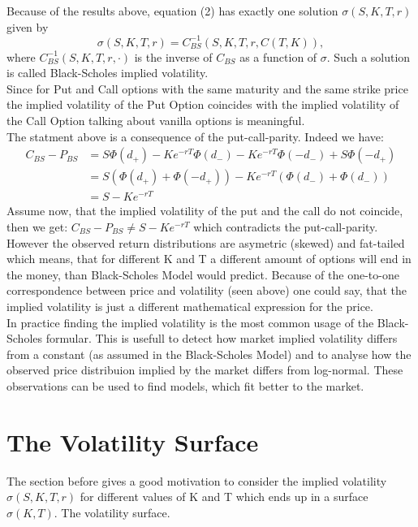 \documentclass[12pt]{article}
\newcommand{\C}{C_{BS}}
\begin{document}
Because of the results above, equation (2) has exactly one solution $\sigma(S,K,T,r)$ given by
$$\sigma(S,K,T,r)=\C^{-1}(S,K,T,r,C(T,K)),$$
where $\C^{-1}(S,K,T,r,\cdot)$ is the inverse of $\C$ as a function of $\sigma$.
Such a solution is called Black-Scholes implied volatility.\\
Since for Put and Call options with the same maturity and the same strike price the implied volatility of the Put Option coincides with the implied volatility of the Call Option talking about vanilla options is meaningful.\\
The statment above is a consequence of the put-call-parity. Indeed we have:
\begin{align*}
\C-P_{BS}&=S\Phi(d_+)-Ke^{-rT}\Phi(d_-)-Ke^{-rT}\Phi(-d_-)+S\Phi(-d_+)\\
&=S(\Phi(d_+)+\Phi(-d_+))-Ke^{-rT}(\Phi(d_-)+\Phi(d_-))\\
&=S-Ke^{-rT}
\end{align*}
Assume now, that the implied volatility of the put and the call do not coincide, then we get:
$\C-P_{BS}\neq S-Ke^{-rT}$ which contradicts the put-call-parity.\\
However the observed return distributions are asymetric (skewed) and fat-tailed which means, that for different K and T a different amount of options will end in the money, than Black-Scholes Model would predict. 
Because of the one-to-one correspondence between price and volatility (seen above) one could say, that the implied volatility is just a different mathematical expression for the price.\\
In practice finding the implied volatility is the most common usage of the Black-Scholes formular. This is usefull to detect how market implied volatility differs from a constant (as assumed in the Black-Scholes Model) and to analyse how the observed price distribuion implied by the market differs from log-normal. These observations can be used to find models, which fit better to the market.

\section{The Volatility Surface}
The section before gives a good motivation to consider the implied volatility $\sigma(S,K,T,r)$ for different values of K and T which ends up in a surface $\sigma(K,T)$. The volatility surface.
\end{document}

